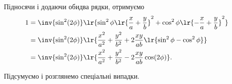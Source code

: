 Підносячи і додаючи обидва рядки, отримуємо
\begin{equation}\label{eqn:polarizationReview:140}
\begin{aligned}
1
&=
\inv{\sin^2(2\phi)}
\lr{
\sin^2\phi
\lr{
    \frac{x}{a}
   + \frac{y}{b}
}^2
+
\cos^2\phi
\lr{
   -\frac{x}{a}
   + \frac{y}{b}
}^2
}
\\ &=
\inv{\sin^2(2\phi)}
\lr{
    \frac{x^2}{a^2}
    + \frac{y^2}{b^2}
+ 2 \frac{x y}{a b} \lr{\sin^2\phi - \cos^2\phi}
}
\\ &=
\inv{\sin^2(2\phi)}
\lr{
    \frac{x^2}{a^2}
    + \frac{y^2}{b^2}
- 2 \frac{x y}{a b} \cos(2\phi)
}.
\end{aligned}
\end{equation}

Підсумуємо і розглянемо спеціальні випадки.

